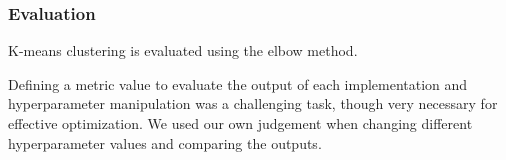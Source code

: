 \documentclass[sigconf,authorversion,nonacm]{acmart}
\begin{document}
\subsubsection{Evaluation}
K-means clustering is evaluated using the elbow method.

Defining a metric value to evaluate the output of each implementation and hyperparameter manipulation was a challenging task, though very necessary for effective optimization. We used our own judgement when changing different hyperparameter values and comparing the outputs.

\nocite{*}


\end{document}
